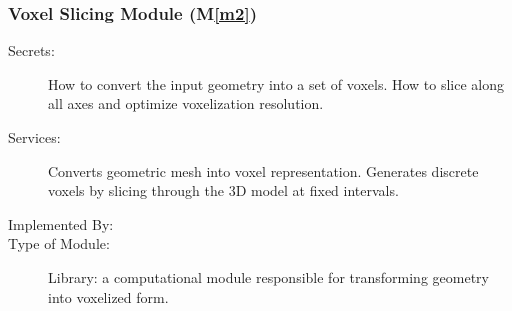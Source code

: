 \documentclass[12pt, titlepage]{article}
\newcommand{\mref}[1]{M\ref{#1}}
\begin{document}
\subsubsection{Voxel Slicing Module (\mref{m2})}

\begin{description}
\item[Secrets:] How to convert the input geometry into a set of voxels. How to slice along all axes and optimize voxelization resolution.
\item[Services:] Converts geometric mesh into voxel representation. Generates discrete voxels by slicing through the 3D model at fixed intervals. 
\item[Implemented By:] \progname{}
\item[Type of Module:] Library: a computational module responsible for transforming geometry into voxelized form.
\end{description}

\end{document}
